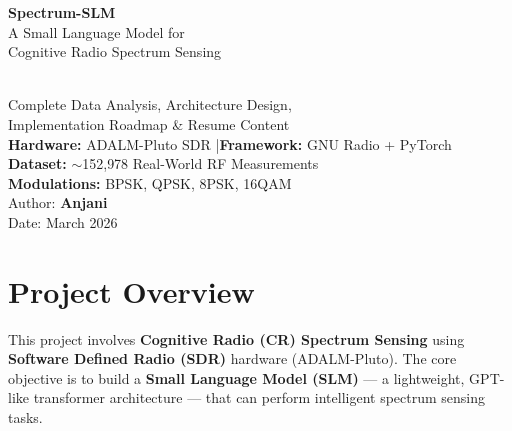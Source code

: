 \documentclass[12pt, a4paper]{article}
\begin{document}
\begin{titlepage}
    \centering
    \vspace*{2cm}

    {\Huge\bfseries\textcolor{deepblue}{Spectrum-SLM}}\\[0.6cm]
    {\LARGE\textcolor{accentred}{A Small Language Model for}}\\[0.3cm]
    {\LARGE\textcolor{accentred}{Cognitive Radio Spectrum Sensing}}\\[1.5cm]

    \\[1.5cm]

    {\Large Complete Data Analysis, Architecture Design,\\[0.3cm]
     Implementation Roadmap \& Resume Content}\\[2cm]

    {\large\textbf{Hardware:} ADALM-Pluto SDR \quad|\quad \textbf{Framework:} GNU Radio + PyTorch}\\[0.5cm]
    {\large\textbf{Dataset:} $\sim$152{,}978 Real-World RF Measurements}\\[0.5cm]
    {\large\textbf{Modulations:} BPSK, QPSK, 8PSK, 16QAM}\\[2cm]

    {\large Author: \textbf{Anjani}}\\[0.3cm]
    {\large Date: March 2026}

    \vfill
\end{titlepage}

\tableofcontents
\newpage

\section{Project Overview}

This project involves \textbf{Cognitive Radio (CR) Spectrum Sensing} using \textbf{Software Defined Radio (SDR)} hardware (ADALM-Pluto). The core objective is to build a \textbf{Small Language Model (SLM)} — a lightweight, GPT-like transformer architecture — that can perform intelligent spectrum sensing tasks.
\end{document}
